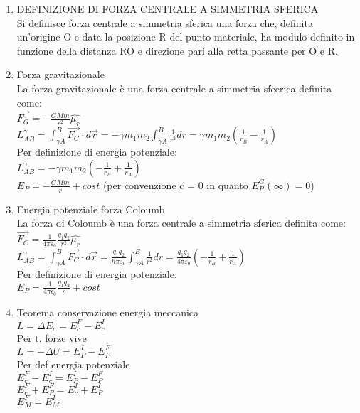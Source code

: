 \documentclass[8pt]{scrreprt}
\begin{document}
\begin{multicols*}{2}
\begin{enumerate}
\item DEFINIZIONE DI FORZA CENTRALE A SIMMETRIA SFERICA\\
Si definisce forza centrale a simmetria sferica una forza che, definita un’origine O e data la posizione R del punto materiale, ha modulo definito in funzione della distanza RO e direzione pari alla retta passante per O e R. {}

\item Forza gravitazionale\\
La forza gravitazionale è una forza centrale a simmetria sfeerica definita come:\\
$\vec{F_G} = -\frac{GMm}{r^2}\hat{\mu_r}$\\
$L_{AB}^\gamma = \int_{\gamma A}^{B} \vec{F_G} \cdot d\vec{r} = -\gamma m_1 m_2 \int_{\gamma A}^{B} \frac{1}{r^2} dr = \gamma m_1 m_2 \left(\frac{1}{r_B} - \frac{1}{r_A}\right)$\\
Per definizione di energia potenziale:\\
$L_{AB}^\gamma = - \gamma m_1 m_2 \left(- \frac{1}{r_B} + \frac{1}{r_A}\right)$\\
$E_P = -\frac{GMm}{r} + cost$ (per convenzione c = 0 in quanto $E_P^G(\infty) = 0$)

\item Energia potenziale forza Coloumb\\
La forza di Coloumb è una forza centrale a simmetria sferica definita come:\\
$\vec{F_C} = \frac{1}{4\pi \varepsilon_0} \frac{q_1 q_2}{r^2}\hat{\mu_r}$\\
$L_{AB}^\gamma = \int_{\gamma A}^{B} \vec{F_C} \cdot d\vec{r} = \frac{q_1q_2}{h\pi\varepsilon_0} \int_{\gamma A}^{B} \frac{1}{r^2} dr = \frac{q_1q_2}{4\pi\varepsilon_0} \left(-\frac{1}{r_B} + \frac{1}{r_A}\right)$\\
Per definizione di energia potenziale:\\
$E_P = \frac{1}{4\pi\epsilon_0} \frac{q_1q_2}{r} + cost$

\item Teorema conservazione energia meccanica\\
$L = \Delta E_c = E_c^F - E_c^I$\\ Per t. forze vive\\
$L = -\Delta U = E_P^I - E_P^F$\\ Per def energia potenziale\\
$E_c^F -E_c^I = E_P^I - E_P^F$\\
$E_c^F + E_P^F = E_c^I + E_P^I$\\
$E_M^F = E_M^I$


\end{enumerate}
\end{multicols*}
\end{document}
